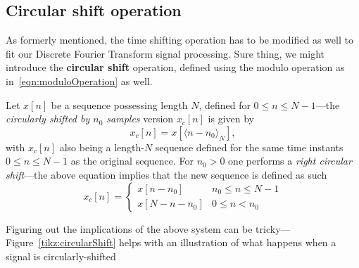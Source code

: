 \documentclass[\documentfontsize, twocolumn]{\classname}
\begin{document}
\subsection{Circular shift operation}
As formerly mentioned, the time shifting operation has to be modified as well to fit our Discrete Fourier Transform signal processing. Sure thing, we might introduce the \textbf{circular shift} operation, defined using the modulo operation as in~\ref{eqn:moduloOperation} as well.

Let $x[n]$ be a sequence possessing length $N$, defined for $0 \leq n \leq N-1$---the \emph{circularly shifted by $n_0$ samples} version $x_c[n]$ is given by
\begin{equation}\label{eqn:circularShift}
    x_c[n] = x[\langle n - n_0 \rangle_N],
\end{equation}
with $x_c[n]$ also being a length-$N$ sequence defined for the same time instants $0\leq n \leq N-1$ as the original sequence. For $n_0 > 0$ one performs a \emph{right circular shift}---the above equation implies that the new sequence is defined as such
\[
    x_c[n] = 
    \left\{
        \begin{array}{ll}
            x[n-n_0] & n_0 \leq n \leq N-1\\
            x[N- n-n_0] & 0 \leq n < n_0
        \end{array}
    \right.
\]

Figuring out the implications of the above system can be tricky---Figure~\ref{tikz:circularShift} helps with an illustration of what happens when a signal is circularly-shifted
\end{document}
